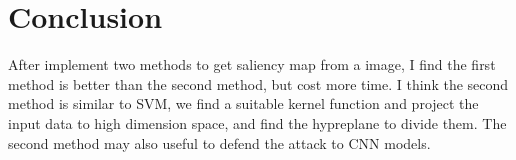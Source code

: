 \documentclass[10pt,twocolumn,letterpaper]{article}
\begin{document}
\section{Conclusion}
After implement two methods to get saliency map from a image, I find the first method is better than the second method, but cost more time. I think the second method is similar to SVM, we find a suitable kernel function and project the input data to high dimension space, and find the hypreplane to divide them. The second method may also useful to defend the attack to CNN models.


{\small


}
\end{document}
